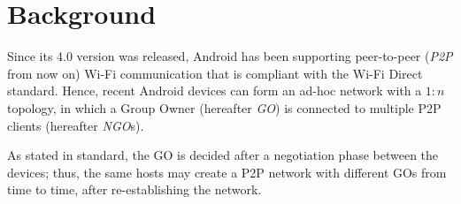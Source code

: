 \section{Background} %
Since its 4.0 version was released, Android has been supporting peer-to-peer
(\textit{P2P} from now on) Wi-Fi communication that is compliant with the
Wi-Fi Direct standard\cite{bib:wifiP2pspec}.
Hence, recent Android devices can form an ad-hoc network with a $1:n$ topology,
in which a Group Owner (hereafter \textit{GO}) is connected to multiple P2P
clients (hereafter \textit{NGO}s).

As stated in standard, the GO is decided after a negotiation phase between the
devices; thus, the same hosts may create a P2P network with different GOs from
time to time, after re-establishing the network.
